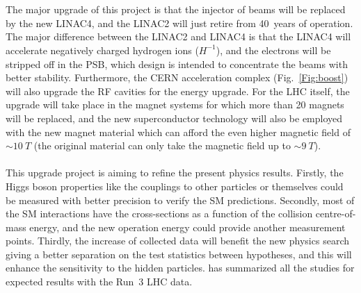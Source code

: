 \noindent
\\
\\The major upgrade of this project is that the injector of beams will be replaced by the new LINAC4, and the LINAC2 will just retire from 40~years of operation. The major difference between the LINAC2 and LINAC4 is that the LINAC4 will accelerate negatively charged hydrogen ions ($H^{-1}$), and the electrons will be stripped off in the PSB, which design is intended to concentrate the beams with better stability\cite{LINAC4}. Furthermore, the CERN acceleration complex (Fig.~\ref{Fig:boost}) will also upgrade the RF cavities for the energy upgrade. For the LHC itself, the upgrade will take place in the magnet systems for which more than 20 magnets will be replaced, and the new superconductor technology will also be employed with the new magnet material which can afford the even higher magnetic field of $\sim 10~T$ (the original material can only take the magnetic field up to $\sim 9~T$). 
\\
\\This upgrade project is aiming to refine the present physics results. Firstly, the Higgs boson properties like the couplings to other particles or themselves could be measured with better precision to verify the SM predictions. Secondly, most of the SM interactions have the cross-sections as a function of the collision centre-of-mass energy, and the new operation energy could provide another measurement points. Thirdly, the increase of collected data will benefit the new physics search giving a better separation on the test statistics between hypotheses, and this will enhance the sensitivity to the hidden particles. \cite{Atlas:2019qfx} has summarized all the studies for expected results with the Run~3 LHC data.
